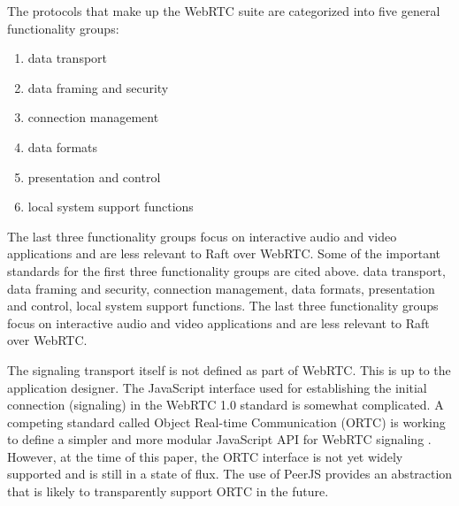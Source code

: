 \documentclass[conference,compsoc]{./IEEEtran/IEEEtran}
\begin{document}
The protocols that make up the WebRTC suite are categorized into five
general functionality groups:
\ifdefined\OPTIONAL

\begin{enumerate}
    \item data transport
        \\
        \cite{draft-rtcweb-transports}
        \cite{draft-rtcweb-qos}
        \cite{RFC4960:sctp}
        \cite{RFC3758:sctp-reliability}
        \cite{draft-sctp-dtls-encaps}
        \cite{draft-mmusic-sctp-sdp}
        \cite{draft-sctp-ndata}
        \cite{draft-rtcweb-rtp-usage}
        \cite{draft-rtcweb-data-channel}
        \cite{draft-rtcweb-data-protocol}
        \cite{draft-rtcweb-alpn}
        \cite{RFC5245:ice}
        \cite{RFC5128:p2p-nat}
        \cite{RFC5389:stun}
        \cite{RFC3489:stun-udp}
        \cite{RFC5766:turn}
        \cite{RFC6156:turn-ipv6}
        \cite{RFC6544:tcp-ice}
        \cite{RFC4571:rtp-rtcp}
        \cite{RFC5764:dtls-srtp}
    \item data framing and security
        \\
        \cite{RFC3550:rtp}
        \cite{RFC3711:srtp}
        \cite{draft-rtcweb-rtp-usage}
        \cite{draft-rtcweb-data-channel}
        \cite{draft-rtcweb-data-protocol}
    \item connection management
        \\
        \cite{RFC2327:sdp}
        \cite{RFC3264:sdp-offer-answer}
        \cite{draft-rtcweb-jsep}
        \cite{RFC5245:ice}
        \cite{draft-mmusic-trickle-ice}
        \cite{RFC5763:srtp-using-dtls}
    \item data formats
    \item presentation and control
    \item local system support functions
\end{enumerate}

The last three functionality groups focus on interactive audio and video
applications and are less relevant to Raft over WebRTC.
Some of the important standards for the first three functionality
groups are cited above.
\else
data transport, data framing and security, connection management, data
formats, presentation and control, local system support functions.
The last three functionality groups focus on interactive audio and
video applications and are less relevant to Raft over WebRTC.
\fi

The signaling transport itself is not defined as part of WebRTC.
This is up to the application designer. The JavaScript interface used
for establishing the initial connection (signaling) in the WebRTC 1.0
standard is somewhat complicated. A competing standard called Object
Real-time Communication (ORTC) is working to define a simpler and more
modular JavaScript API for WebRTC signaling \cite{ortc2014}. However,
at the time of this paper, the ORTC interface is not yet widely
supported and is still in a state of flux. The use of PeerJS provides an
abstraction that is likely to transparently support ORTC in the future.
\end{document}
